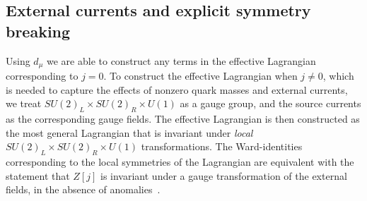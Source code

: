 \subsection*{External currents and explicit symmetry breaking}
\label{Covarinat derivative}

Using $d_\mu$ we are able to construct any terms in the effective Lagrangian corresponding to $j=0$.
To construct the effective Lagrangian when $j \neq 0$, which is needed to capture the effects of nonzero quark masses and external currents, we treat $SU(2)_L\times SU(2)_R\times U(1)$ as a gauge group, and the source currents as the corresponding gauge fields.
The effective Lagrangian is then constructed as the most general Lagrangian that is invariant under \emph{local} $SU(2)_L\times SU(2)_R\times U(1)$ transformations.
The Ward-identities corresponding to the local symmetries of the Lagrangian are equivalent with the statement that $Z[j]$ is invariant under a gauge transformation of the external fields, in the absence of anomalies~\cite{Leutwyler:on_the_fundations}.

